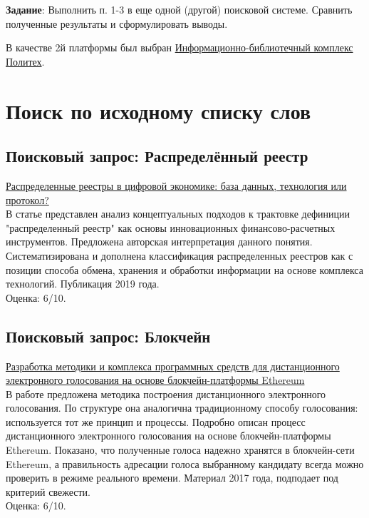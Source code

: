 \documentclass[a4paper, 12pt]{report}		%
\begin{document}
\textbf{Задание}: Выполнить п. 1-3 в еще одной (другой) поисковой системе. Сравнить полученные результаты и сформулировать выводы.

В качестве 2й платформы был выбран \href{https://library.spbstu.ru/ru/}{Информационно-библиотечный комплекс Политех}.

\section*{Поиск по исходному списку слов}

\subsection*{Поисковый запрос: Распределённый реестр}

\href{https://ruslan.library.spbstu.ru/pwb/detail?db=ANALITS2005&id=RU%5CSPSTU%5Canalits2005%5C391759}{Распределенные реестры в цифровой экономике: база данных, технология или протокол?}\\
В статье представлен анализ концептуальных подходов к трактовке дефиниции "распределенный реестр" как основы инновационных финансово-расчетных инструментов. Предложена авторская интерпретация данного понятия. Систематизирована и дополнена классификация распределенных реестров как с позиции способа обмена, хранения и обработки информации на основе комплекса технологий. Публикация 2019 года.\\
Оценка: 6/10.

\subsection*{Поисковый запрос: Блокчейн}

\href{https://ruslan.library.spbstu.ru/pwb/detail?db=ANALITS2005&id=8c229831-1a03-4873-b151-28e250859458}{Разработка методики и комплекса программных средств для дистанционного электронного голосования на основе блокчейн-платформы Ethereum}\\
В работе предложена методика построения дистанционного электронного голосования. По структуре она аналогична традиционному способу голосования: используется тот же принцип и процессы. Подробно описан процесс дистанционного электронного голосования на основе блокчейн-платформы Ethereum. Показано, что полученные голоса надежно хранятся в блокчейн-сети Ethereum, а правильность адресации голоса выбранному кандидату всегда можно проверить в режиме реального времени. Материал 2017 года, подподает под критерий свежести.\\
Оценка: 6/10.
\end{document}
